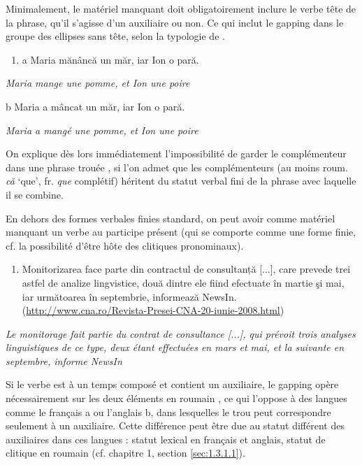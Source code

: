 Minimalement, le matériel manquant doit obligatoirement inclure le verbe tête de la phrase, qu'il s'agisse d'un auxiliaire ou non. Ce qui inclut le gapping dans le groupe des ellipses sans tête, selon la typologie de \citet{Chao1988}.


\begin{enumerate}
\item a  Maria mănâncă un măr, iar Ion o pară.


\end{enumerate}
{\itshape
Maria mange une pomme, et Ion une poire } 

  b  Maria a mâncat un măr, iar Ion o pară.

    \textit{Maria a mangé une pomme, et Ion une poire}

On explique dès lors immédiatement l'impossibilité de garder le complémenteur dans une phrase trouée , si l'on admet que les complémenteurs (au moins roum. \textit{că} `que', fr. \textit{que} complétif) héritent du statut verbal fini de la phrase avec laquelle il se combine.

En dehors des formes verbales finies standard, on peut avoir comme matériel manquant un verbe au participe présent (qui se comporte comme une forme finie, cf. la possibilité d'être hôte des clitiques pronominaux).  


\begin{enumerate}
\item Monitorizarea face parte din contractul de consultanță [...], care prevede trei astfel de analize lingvistice, două dintre ele fiind efectuate în martie şi mai, iar următoarea în septembrie, informează NewsIn. (\url{http://www.cna.ro/Revista-Presei-CNA-20-iunie-2008.html})


\end{enumerate}
{\itshape
Le monitorage fait partie du contrat de consultance [...], qui prévoit trois analyses linguistiques de ce type, deux étant effectuées en mars et mai, et la suivante en septembre, informe NewsIn } 

Si le verbe est à un temps composé et contient un auxiliaire, le gapping opère nécessairement sur les deux éléments en roumain , ce qui l'oppose à des langues comme le français a ou l'anglais b, dans lesquelles le trou peut correspondre seulement à un auxiliaire. Cette différence peut être due au statut différent des auxiliaires dans ces langues : statut lexical en français et anglais, statut de clitique en roumain (cf. chapitre 1, section \ref{sec:1.3.1.1}).


